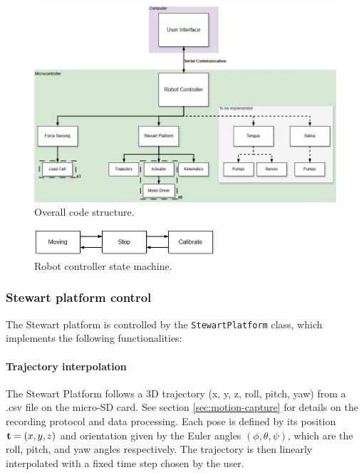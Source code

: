 \begin{figure}[H]
\centering
\includegraphics[width=\textwidth]{figures/code_structure.drawio.png}
\caption{Overall code structure.}
\label{fig:code_structure}
\end{figure}


\begin{figure}[H]
\centering
\includegraphics[width=0.6\textwidth]{figures/state_machine.drawio.png}
\caption{Robot controller state machine.}
\label{fig:state_machine}
\end{figure}

\subsubsection{Stewart platform control}

The Stewart platform is controlled by the \texttt{StewartPlatform} class, which implements the following functionalities:
\paragraph{Trajectory interpolation}
The Stewart Platform follows a 3D trajectory (x, y, z, roll, pitch, yaw) from a .csv file on the micro-SD card.
See section \ref{sec:motion-capture} for details on the recording protocol and data processing.
Each pose is defined by its position ${\bf t}=(x,y,z)$ and orientation given by the Euler angles $(\phi,\theta,\psi)$,
 which are the roll, pitch, and yaw angles respectively.
The trajectory is then linearly interpolated with a fixed time step chosen by the user.

